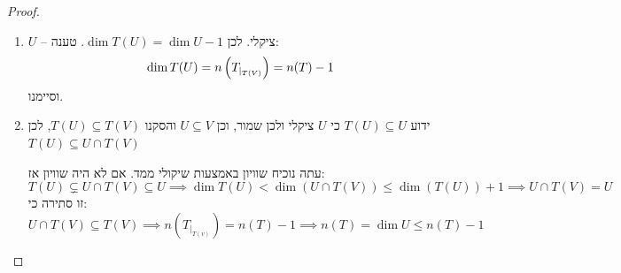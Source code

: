 \documentclass[]{../../../../tex/classes/styledArticle}
\begin{document}
    
    \begin{proof}\,
        \begin{enumerate}
            \item $U$ – ציקלי. לכן $\dim T(U) = \dim U - 1$. 
            טענה: 
            \[ \dim T(U) = n\left ( T_{|_{T(V)}} \right ) = n(T) - 1 \]
            וסיימנו. 
            \item ידוע $T(U) \subseteq U$ כי $U$ ציקלי ולכן שמור, וכן $U \subseteq V$ והסקנו $T(U) \subseteq T(V)$, לכן $T(U) \subseteq U \cap T(V)$
            
            עתה נוכיח שוויון באמצעות שיקולי ממד. אם לא היה שוויון אז: 
            \[ T(U) \subsetneq U \cap T(V) \subseteq U \implies \dim T(U) < \dim (U \cap T(V)) \le \dim (T(U)) + 1 \implies U \cap T(V) = U \]
            זו סתירה כי: 
            \[ U \cap T(V) \subseteq T(V) \implies n(T_{|_{T(v)}}) = n(T) - 1 \implies n(T) = \dim U \le n(T) - 1 \]
            
        \end{enumerate}
    \end{proof}
    
\end{document}

